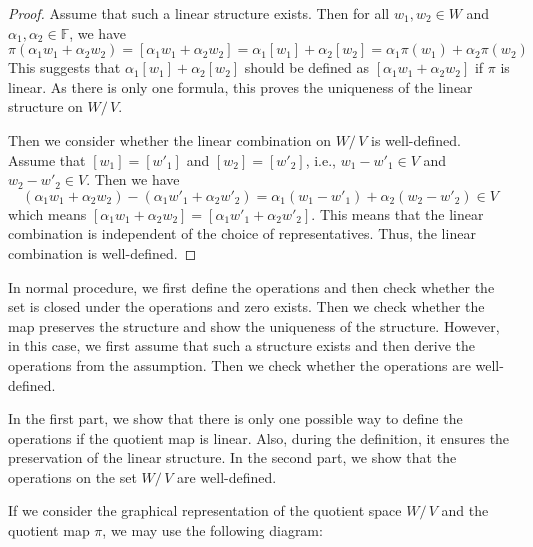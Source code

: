 \documentclass[
	11pt, %
	fleqn, %
	a4paper, %
]{LegrandOrangeBook}
\newcommand{\quotient}[2]{#1 /\, #2} %
\newcommand{\F}{\mathbb{F}} %
\begin{document}
\begin{proof}
    Assume that such a linear structure exists. Then for all $w_1, w_2 \in W$ and $\alpha_1, \alpha_2 \in \F$, we have
    \[
        \pi(\alpha_1 w_1 + \alpha_2 w_2) = [\alpha_1 w_1 + \alpha_2 w_2] = \alpha_1 [w_1] + \alpha_2 [w_2] = \alpha_1 \pi(w_1) + \alpha_2 \pi(w_2)
    \]
    This suggests that $\alpha_1 [w_1] + \alpha_2 [w_2]$ should be defined as $[\alpha_1 w_1 + \alpha_2 w_2]$ if $\pi$ is linear. As there is only one formula, this proves the uniqueness of the linear structure on $\quotient{W}{V}$.

    Then we consider whether the linear combination on $\quotient{W}{V}$ is well-defined. Assume that $[w_1] = [w'_1]$ and $[w_2] = [w'_2]$, i.e., $w_1 - w'_1 \in V$ and $w_2 - w'_2 \in V$. Then we have
    \[
        (\alpha_1 w_1 + \alpha_2 w_2) - (\alpha_1 w'_1 + \alpha_2 w'_2) = \alpha_1 (w_1 - w'_1) + \alpha_2 (w_2 - w'_2) \in V
    \]
    which means $[\alpha_1 w_1 + \alpha_2 w_2] = [\alpha_1 w'_1 + \alpha_2 w'_2]$. This means that the linear combination is independent of the choice of representatives. Thus, the linear combination is well-defined.
\end{proof}

In normal procedure, we first define the operations and then check whether the set is closed under the operations and zero exists. Then we check whether the map preserves the structure and show the uniqueness of the structure. However, in this case, we first assume that such a structure exists and then derive the operations from the assumption. Then we check whether the operations are well-defined.

In the first part, we show that there is only one possible way to define the operations if the quotient map is linear. Also, during the definition, it ensures the preservation of the linear structure. In the second part, we show that the operations on the set $\quotient{W}{V}$ are well-defined.

If we consider the graphical representation of the quotient space $\quotient{W}{V}$ and the quotient map $\pi$, we may use the following diagram:
\end{document}
